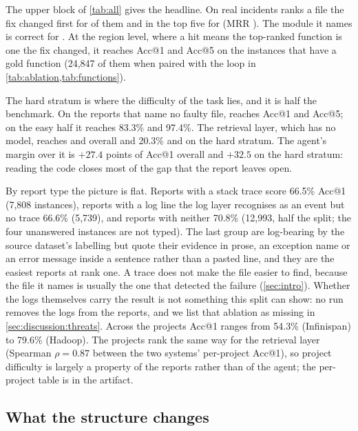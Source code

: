 The upper block of \cref{tab:all} gives the headline. On \nEval{} real incidents
\sys{} ranks a file the fix changed first for \accOne{} of them and in
the top five for \accFive{} (MRR \mrr). The module it names is correct
for \modOne{}. At the region level, where a hit means the top-ranked
function is one the fix changed, it reaches \regOne{} Acc@1 and
\regFive{} Acc@5 on the \nRegion{} instances that have a gold
function (24{,}847 of them when paired with the loop in
\cref{tab:ablation,tab:functions}).

The hard stratum is where the difficulty of the task lies, and it is
half the benchmark. On the \nEvalHard{} reports that name no faulty
file, \sys{} reaches \hardOne{} Acc@1 and \hardFive{} Acc@5; on the easy
half it reaches 83.3\% and 97.4\%. The retrieval layer, which has no
model, reaches \retrOne{} and \retrFive{} overall and 20.3\% and
\retrHardFive{} on the hard stratum. The agent's margin over it is
$+27.4$ points of Acc@1 overall and $+32.5$ on the hard stratum: reading
the code closes most of the gap that the report leaves open.

By report type the picture is flat. Reports with a stack trace score
66.5\% Acc@1 (7{,}808 instances), reports with a log line the log layer
recognises as an event but no trace 66.6\% (5{,}739), and reports with
neither 70.8\% (12{,}993, half the split; the four unanswered instances
are not typed). The last group are
log-bearing by the source dataset's labelling but quote their evidence
in prose, an exception name or an error message inside a sentence
rather than a pasted line, and they are the easiest reports at rank
one. A trace does not make the file easier to find, because the file it
names is usually the one that detected the failure (\cref{sec:intro}).
Whether the logs themselves carry the result is not something this
split can show: no run removes the logs from the reports, and we list
that ablation as missing in \cref{sec:discussion:threats}. Across the
\nProjects{} projects Acc@1 ranges
from 54.3\% (Infinispan) to 79.6\% (Hadoop). The projects rank the same
way for the retrieval layer (Spearman $\rho = 0.87$ between the two
systems' per-project Acc@1), so project difficulty is largely a property
of the reports rather than of the agent; the per-project table is in the
artifact.

\subsection{What the structure changes}
\label{sec:results:structure}

